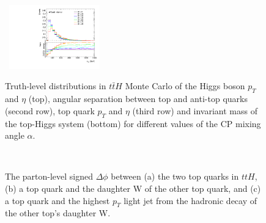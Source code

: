 \begin{figure}[!ht]
\begin{center}
{    }
    \mbox{ 
      \includegraphics[width=0.35\textwidth]{figures/tthcp_chapter/observables/ttH/c_tH_m.pdf}
    }
  \end{center}
  \caption{Truth-level distributions in $t\bar{t}H$ Monte Carlo of the Higgs boson $p_{T}$ and $\eta$ (top), angular separation between top and anti-top quarks (second row), top quark $p_{T}$ and $\eta$ (third row) and invariant mass of the top-Higgs system (bottom) for different values of the CP mixing angle $\alpha$.}
  \label{fig:ttH_truth}
\end{figure}

\begin{figure}[htbp]
  \centering
  	\\
  \caption{The parton-level signed $\Delta\phi$ between (a) the two top quarks in $ttH$, (b) a top quark and the daughter W of the other top quark, and (c) a top quark and the highest $p_{T}$ light jet from the hadronic decay of the other top's daughter W.}
  \label{fig:ttH_truth2}
\end{figure}
\clearpage


